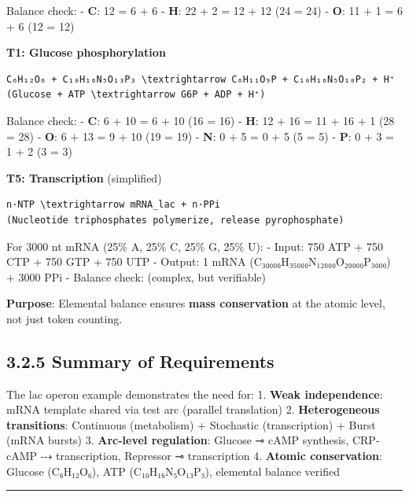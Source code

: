 Balance check: - \textbf{C}: 12 = 6 + 6 \checkmark - \textbf{H}: 22 + 2 = 12 + 12
\checkmark (24 = 24) - \textbf{O}: 11 + 1 = 6 + 6 \checkmark (12 = 12)

\textbf{T1: Glucose phosphorylation}

\begin{lstlisting}
C₆H₁₂O₆ + C₁₀H₁₆N₅O₁₃P₃ \textrightarrow C₆H₁₁O₉P + C₁₀H₁₆N₅O₁₀P₂ + H⁺
(Glucose + ATP \textrightarrow G6P + ADP + H⁺)
\end{lstlisting}

Balance check: - \textbf{C}: 6 + 10 = 6 + 10 \checkmark (16 = 16) - \textbf{H}:
12 + 16 = 11 + 16 + 1 \checkmark (28 = 28) - \textbf{O}: 6 + 13 = 9 + 10 \checkmark (19 =
19) - \textbf{N}: 0 + 5 = 0 + 5 \checkmark (5 = 5) - \textbf{P}: 0 + 3 = 1 + 2 \checkmark
(3 = 3)

\textbf{T5: Transcription} (simplified)

\begin{lstlisting}
n·NTP \textrightarrow mRNA_lac + n·PPi
(Nucleotide triphosphates polymerize, release pyrophosphate)
\end{lstlisting}

For 3000 nt mRNA (25\% A, 25\% C, 25\% G, 25\% U): - Input: 750 ATP +
750 CTP + 750 GTP + 750 UTP - Output: 1 mRNA
(C₃₀₀₀₀H₃₅₀₀₀N₁₂₀₀₀O₂₀₀₀₀P₃₀₀₀) + 3000 PPi - Balance check: (complex,
but verifiable)

\textbf{Purpose}: Elemental balance ensures \textbf{mass conservation}
at the atomic level, not just token counting.

\hypertarget{summary-of-requirements}{%
\subsection{3.2.5 Summary of
Requirements}\label{summary-of-requirements}}

The lac operon example demonstrates the need for: 1. \checkmark \textbf{Weak
independence}: mRNA template shared via test arc (parallel translation)
2. \checkmark \textbf{Heterogeneous transitions}: Continuous (metabolism) +
Stochastic (transcription) + Burst (mRNA bursts) 3. \checkmark \textbf{Arc-level
regulation}: Glucose ⊸ cAMP synthesis, CRP-cAMP ⤏ transcription,
Repressor ⊸ transcription 4. \checkmark \textbf{Atomic conservation}: Glucose
(C₆H₁₂O₆), ATP (C₁₀H₁₆N₅O₁₃P₃), elemental balance verified

\begin{center}\rule{0.5\linewidth}{0.5pt}\end{center}

